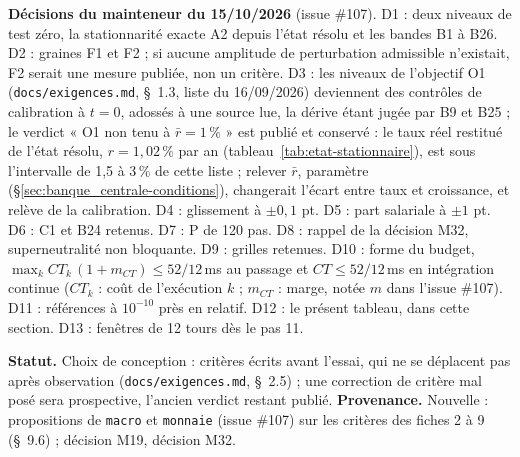 \documentclass[11pt,a4paper]{article}
\begin{document}
\begin{proposee}
\textbf{Décisions du mainteneur du 15/10/2026} (issue \#107). D1 : deux niveaux de test zéro, la stationnarité exacte A2 depuis l'état résolu et les bandes B1 à B26. D2 : graines F1 et F2 ; si aucune amplitude de perturbation admissible n'existait, F2 serait une mesure publiée, non un critère. D3 : les niveaux de l'objectif O1 (\nolinkurl{docs/exigences.md}, \S~1.3, liste du 16/09/2026) deviennent des contrôles de calibration à $t = 0$, adossés à une source lue, la dérive étant jugée par B9 et B25 ; le verdict « O1 non tenu à $\bar r = 1\,\%$ » est publié et conservé : le taux réel restitué de l'état résolu, $r = 1{,}02\,\%$ par an (tableau~\ref{tab:etat-stationnaire}), est sous l'intervalle de 1,5 à 3\,\% de cette liste ; relever $\bar r$, paramètre (\S\ref{sec:banque_centrale-conditions}), changerait l'écart entre taux et croissance, et relève de la calibration. D4 : glissement à $\pm 0{,}1$ pt. D5 : part salariale à $\pm 1$ pt. D6 : C1 et B24 retenus. D7 : P de 120 pas. D8 : rappel de la décision M32, superneutralité non bloquante. D9 : grilles retenues. D10 : forme du budget, $\max_k \mathit{CT}_k\,(1 + m_{\mathit{CT}}) \le 52/12$\,ms au passage et $\mathit{CT} \le 52/12$\,ms en intégration continue ($\mathit{CT}_k$ : coût de l'exécution $k$ ; $m_{\mathit{CT}}$ : marge, notée $m$ dans l'issue \#107). D11 : références à $10^{-10}$ près en relatif. D12 : le présent tableau, dans cette section. D13 : fenêtres de 12 tours dès le pas 11.

\textbf{Statut.} Choix de conception : critères écrits avant l'essai, qui ne se déplacent pas après observation (\nolinkurl{docs/exigences.md}, \S~2.5) ; une correction de critère mal posé sera prospective, l'ancien verdict restant publié. \textbf{Provenance.} Nouvelle : propositions de \texttt{macro} et \texttt{monnaie} (issue \#107) sur les critères des fiches 2 à 9 (\S~9.6) ; décision M19, décision M32.
\end{proposee}
\end{document}
